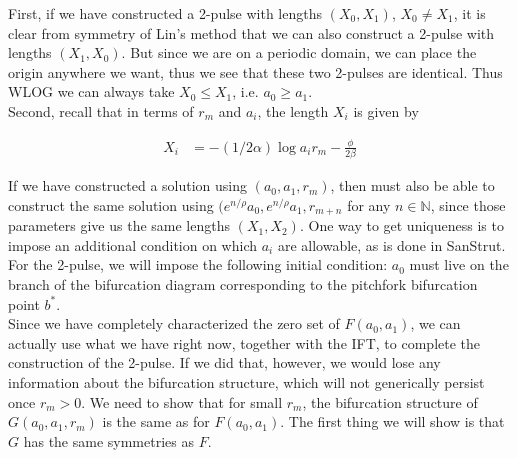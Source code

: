 \documentclass[12pt]{article}
\def\N{{\mathbb N}}
\begin{document}
First, if we have constructed a 2-pulse with lengths $(X_0, X_1)$, $X_0 \neq X_1$, it is clear from symmetry of Lin's method that we can also construct a 2-pulse with lengths $(X_1, X_0)$. But since we are on a periodic domain, we can place the origin anywhere we want, thus we see that these two 2-pulses are identical. Thus WLOG we can always take $X_0 \leq X_1$, i.e. $a_0 \geq a_1$.\\

Second, recall that in terms of $r_m$ and $a_i$, the length $X_i$ is given by 

\begin{align*}
X_i &= -(1/ 2 \alpha)\log a_i r_m - \frac{\phi}{2 \beta} 
\end{align*}

If we have constructed a solution using $(a_0, a_1, r_m)$, then must also be able to construct the same solution using $(e^{n/\rho} a_0, e^{n/\rho} a_1, r_{m+n}$ for any $n \in \N$, since those parameters give us the same lengths $(X_1, X_2)$. One way to get uniqueness is to impose an additional condition on which $a_i$ are allowable, as is done in SanStrut. For the 2-pulse, we will impose the following initial condition: $a_0$ must live on the branch of the bifurcation diagram corresponding to the pitchfork bifurcation point $b^*$. \\

Since we have completely characterized the zero set of $F(a_0, a_1)$, we can actually use what we have right now, together with the IFT, to complete the construction of the 2-pulse. If we did that, however, we would lose any information about the bifurcation structure, which will not generically persist once $r_m > 0$. We need to show that for small $r_m$, the bifurcation structure of $G(a_0, a_1, r_m)$ is the same as for $F(a_0, a_1)$. The first thing we will show is that $G$ has the same symmetries as $F$.

\end{document}
